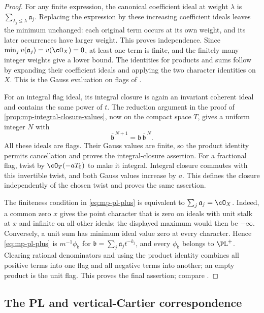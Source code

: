 \begin{proof}
For any finite expression, the canonical coefficient ideal
at weight $\lambda$ is
$\sum_{\lambda_j\leq\lambda}\mathfrak a_j$.
Replacing the expression by these increasing coefficient
ideals leaves the minimum unchanged: each original term
occurs at its own weight, and its later occurrences have
larger weight. This proves independence. Since
$\min_jv(\mathfrak a_j)=v(\cO_X)=0$, at least one term is
finite, and the finitely many integer weights give a lower
bound. The identities for products and sums follow by
expanding their coefficient ideals and applying the two
character identities on $X$. This is the Gauss evaluation
on flags of \cite[equation~(2.4.2)]{MPTropicalV2}.

For an integral flag ideal, its integral closure is again an
invariant coherent ideal and contains the same power of $t$.
The reduction argument in the proof of
\cref{prop:mp-integral-closure-values}, now on the compact
space $T$, gives a uniform integer $N$ with
\[
 \overline{\mathfrak b}^{\,N+1}
       =\mathfrak b\,\overline{\mathfrak b}^{\,N}.
\]
All these ideals are flags. Their Gauss values are finite,
so the product identity permits cancellation and proves
the integral-closure assertion. For a fractional flag, twist
by $\cO_T(-aT_0)$ to make it integral. Integral closure
commutes with this invertible twist, and both Gauss values
increase by $a$. This defines the closure independently of
the chosen twist and proves the same assertion.

The finiteness condition in \eqref{eq:mp-pl-plus} is equivalent
to $\sum_j\mathfrak a_j=\cO_X$. Indeed, a common zero $x$
gives the point character that is zero on ideals with unit
stalk at $x$ and infinite on all other ideals; the displayed
maximum would then be $-\infty$. Conversely, a unit sum
has minimum ideal value zero at every character. Hence
\eqref{eq:mp-pl-plus} is $m^{-1}\phi_{\mathfrak b}$ for
$\mathfrak b=\sum_j\mathfrak a_jt^{-k_j}$, and every
$\phi_{\mathfrak b}$ belongs to $\PL^+$. Clearing rational
denominators and using the product identity combines all
positive terms into one flag and all negative terms into
another; an empty product is the unit flag. This proves
the final assertion; compare
\cite[Proposition~2.4.3]{MPTropicalV2}.
\end{proof}

\subsection{The PL and vertical-Cartier correspondence}
\label{subsec:mp-dual-vcar}


